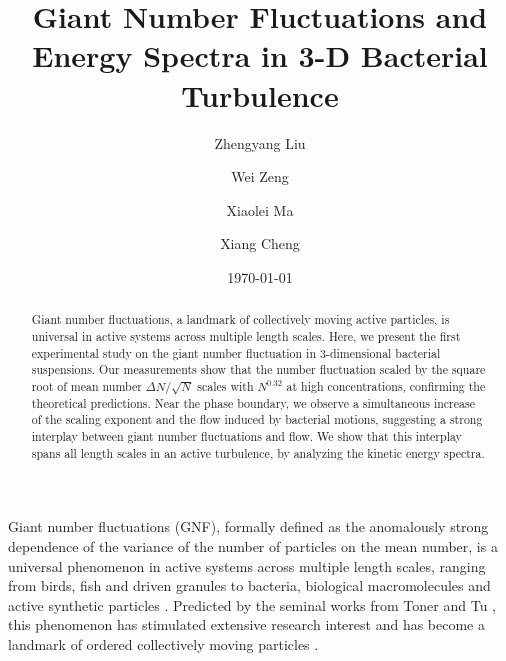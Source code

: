 \documentclass[twocolumn,aps,prl,amsmath,amssymb,longbibliography]{revtex4-2}
\begin{document}
\title{Giant Number Fluctuations and Energy Spectra in 3-D Bacterial Turbulence}

\author{Zhengyang Liu}
\author{Wei Zeng}
\author{Xiaolei Ma}
\author{Xiang Cheng}



\date{\today}


\begin{abstract}
Giant number fluctuations, a landmark of collectively moving active particles, is universal in active systems across multiple length scales. Here, we present the first experimental study on the giant number fluctuation in 3-dimensional bacterial suspensions. Our measurements show that the number fluctuation scaled by the square root of mean number $\Delta N / \sqrt N$ scales with $N^{0.32}$ at high concentrations, confirming the theoretical predictions. Near the phase boundary, we observe a simultaneous increase of the scaling exponent and the flow induced by bacterial motions, suggesting a strong interplay between giant number fluctuations and flow. We show that this interplay spans all length scales in an active turbulence, by analyzing the kinetic energy spectra.

\end{abstract}

\maketitle

Giant number fluctuations (GNF), formally defined as the anomalously strong dependence of the variance of the number of particles on the mean number, is a universal phenomenon in active systems across multiple length scales, ranging from birds, fish and driven granules to bacteria, biological macromolecules and active synthetic particles \cite{Narayan2007, Aranson2008, Ward2008, Ballerini2008, Sokolov2009, Deseigne2010, Zhang2010,
Palacci2013, Schaller2013, Nishiguchi2017, Kawaguchi2017, Karani2019}. Predicted by the seminal works from Toner and Tu
\cite{Toner1995, Tu1998, Toner1998}, this phenomenon has stimulated extensive research interest and has become a landmark of ordered collectively moving particles
\cite{Toner2005, Ramaswamy2010, Vicsek2012, Saintillan2013, Marchetti2013}.
\end{document}
